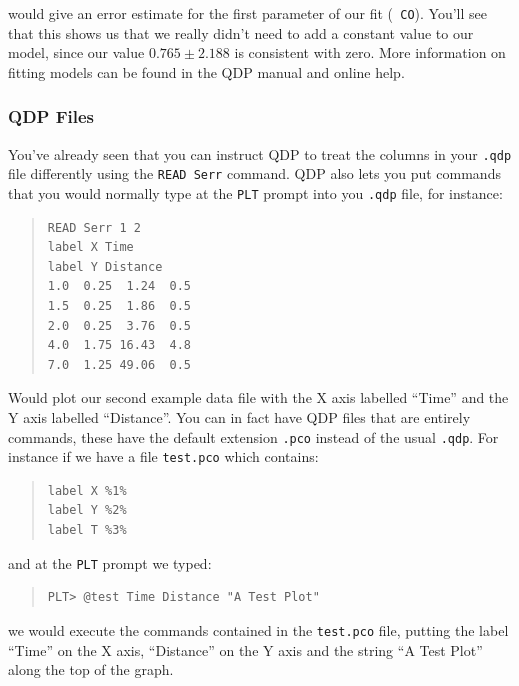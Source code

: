 \documentclass[twoside,11pt]{article}
\newcommand{\htmladdnormallink}[2]{#1}
\begin{document}
would give an error estimate for the first parameter of our fit ({\tt
CO}). You'll see that this shows us that we really didn't need to add
a constant value to our model, since our value $0.765\pm 2.188$ is
consistent with zero. More information on fitting models can be found
in the \htmladdnormallink{QDP
manual}{http://heasarc.gsfc.nasa.gov/docs/software/ftools/others/qdp/node3.html}
and online help.

\subsubsection{QDP Files}

You've already seen that you can instruct QDP to treat the columns in
your {\tt .qdp} file differently using the {\tt READ Serr} command.
QDP also lets you put commands that you would normally type at the
{\tt PLT} prompt into you {\tt .qdp} file, for instance:

\small
\begin{quote}
\begin{verbatim}
READ Serr 1 2
label X Time
label Y Distance
1.0  0.25  1.24  0.5
1.5  0.25  1.86  0.5
2.0  0.25  3.76  0.5
4.0  1.75 16.43  4.8
7.0  1.25 49.06  0.5
\end{verbatim}
\end{quote}
\normalsize

Would plot our second example data file with the X axis labelled
``Time'' and the Y axis labelled ``Distance''. You can in fact have
QDP files that are entirely commands, these have the default extension
{\tt .pco} instead of the usual {\tt .qdp}. For instance if we have a
file {\tt test.pco} which contains:

\small
\begin{quote}
\begin{verbatim}
label X %1%
label Y %2%
label T %3%
\end{verbatim}
\end{quote}
\normalsize

and at the {\tt PLT} prompt we typed:

\small
\begin{quote}
\begin{verbatim}
PLT> @test Time Distance "A Test Plot"
\end{verbatim}
\end{quote}
\normalsize

we would execute the commands contained in the {\tt test.pco} file,
putting the label ``Time'' on the X axis, ``Distance'' on the Y axis
and the string ``A Test Plot'' along the top of the graph.
\end{document}
